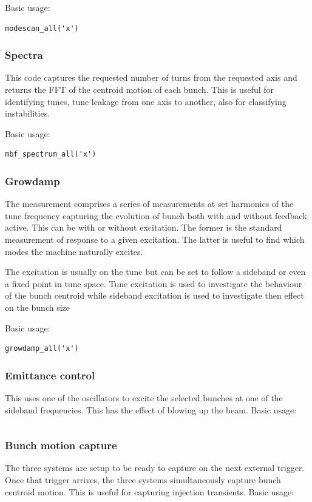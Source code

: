 \documentclass{report}
\begin{document}
Basic usage:
\begin{verbatim}
modescan_all('x')
\end{verbatim}

\subsubsection{Spectra}
This code captures the requested number of turns from the requested axis and returns the FFT of the centroid motion of each bunch. This is useful for identifying tunes, tune leakage from one axis to another, also for classifying instabilities.
\color{red}{EXTEND ANALYSIS TO EXTRACT TUNE LEAKAGE EXPLICITLY}
\color{black}

Basic usage:
\begin{verbatim}
mbf_spectrum_all('x')
\end{verbatim}

\subsubsection{Growdamp}
The measurement comprises a series of measurements at set harmonics of the tune frequency capturing the evolution of bunch both with and without feedback active.
This can be with or without excitation. The former is the standard measurement of response to a given excitation. The latter is useful to find which modes the machine naturally excites.

The excitation is usually on the tune but can be set to follow a sideband or even a fixed point in tune space. Tune excitation is used to investigate the behaviour of the bunch centroid while sideband excitation is used to investigate then effect on the bunch size

Basic usage:
\begin{verbatim}
growdamp_all('x')
\end{verbatim}

\subsubsection{Emittance control}
This uses one of the oscillators to excite the selected bunches at one of the sideband frequencies. This has the effect of blowing up the beam.
Basic usage:
\begin{verbatim}

\end{verbatim}

\subsubsection{Bunch motion capture}
The three systems are setup to be ready to capture on the next external trigger. Once that trigger arrives, the three systems simultaneously capture bunch centroid motion. This is useful for capturing injection transients. 
Basic usage:
\begin{verbatim}
\end{verbatim}
\end{document}
